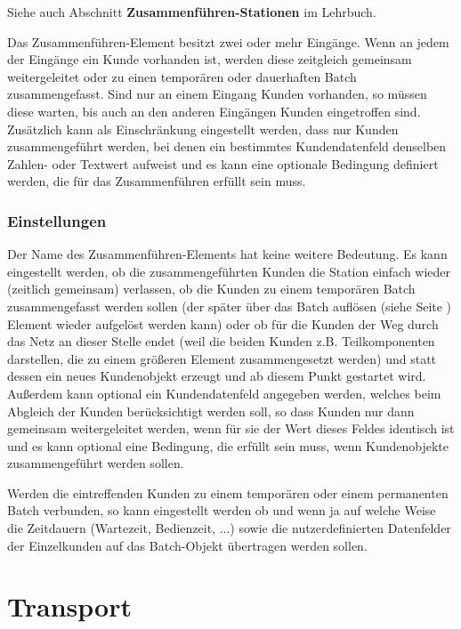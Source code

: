 Siehe auch Abschnitt \textbf{Zusammenführen-Stationen} im Lehrbuch.

Das Zusammenführen-Element besitzt zwei oder mehr Eingänge. Wenn an jedem der Eingänge ein Kunde vorhanden ist,
werden diese zeitgleich gemeinsam weitergeleitet oder zu einen temporären oder dauerhaften Batch zusammengefasst.
Sind nur an einem Eingang Kunden vorhanden, so müssen diese warten, bis auch an den anderen Eingängen Kunden eingetroffen sind.
Zusätzlich kann als Einschränkung eingestellt werden, dass nur Kunden zusammengeführt werden, bei denen ein bestimmtes
Kundendatenfeld denselben Zahlen- oder Textwert aufweist und es kann eine optionale Bedingung definiert werden,
die für das Zusammenführen erfüllt sein muss.

\subsection*{Einstellungen}

Der Name des Zusammenführen-Elements hat keine weitere Bedeutung. Es kann eingestellt werden, ob die zusammengeführten
Kunden die Station einfach wieder (zeitlich gemeinsam) verlassen, ob die Kunden zu einem temporären
Batch zusammengefasst werden sollen (der später über das Batch auflösen (siehe Seite \pageref{ref:ModelElementSeparate}) Element
wieder aufgelöst werden kann) oder ob für die Kunden der Weg durch das Netz an
dieser Stelle endet (weil die beiden Kunden z.B. Teilkomponenten darstellen, die zu einem größeren Element zusammengesetzt
werden) und statt dessen ein neues Kundenobjekt erzeugt und ab diesem Punkt gestartet wird.
Außerdem kann optional ein Kundendatenfeld angegeben werden, welches beim Abgleich der Kunden berücksichtigt werden soll,
so dass Kunden nur dann gemeinsam weitergeleitet werden, wenn für sie der Wert dieses Feldes identisch ist und es kann
optional eine Bedingung, die erfüllt sein muss, wenn Kundenobjekte zusammengeführt werden sollen.

Werden die eintreffenden Kunden zu einem temporären oder einem permanenten Batch verbunden, so kann eingestellt werden
ob und wenn ja auf welche Weise die Zeitdauern (Wartezeit, Bedienzeit, ...) sowie die nutzerdefinierten Datenfelder
der Einzelkunden auf das Batch-Objekt übertragen werden sollen.





\chapter{Transport}

